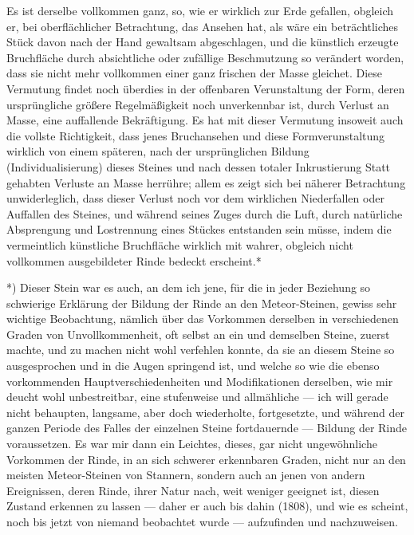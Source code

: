 \documentclass[a4paper, 11pt, oneside, german]{article}
\begin{document}
Es ist derselbe vollkommen ganz, so, wie er wirklich zur Erde gefallen, obgleich er, bei oberflächlicher Betrachtung, das Ansehen hat, als wäre ein beträchtliches Stück davon nach der Hand gewaltsam abgeschlagen, und die künstlich erzeugte Bruchfläche durch absichtliche oder zufällige Beschmutzung so verändert worden, dass sie nicht mehr vollkommen einer ganz frischen der Masse gleichet. Diese Vermutung findet noch überdies in der offenbaren Verunstaltung der Form, deren ursprüngliche größere Regelmäßigkeit noch unverkennbar ist, durch Verlust an Masse, eine auffallende Bekräftigung. Es hat mit dieser Vermutung insoweit auch die vollste Richtigkeit, dass jenes Bruchansehen und diese Formverunstaltung wirklich von einem späteren, nach der ursprünglichen Bildung (Individualisierung) dieses Steines und nach dessen totaler Inkrustierung Statt gehabten Verluste an Masse herrühre; allem es zeigt sich bei näherer Betrachtung unwiderleglich, dass dieser Verlust noch vor dem wirklichen Niederfallen oder Auffallen des Steines, und während seines Zuges durch die Luft, durch natürliche Absprengung und Lostrennung eines Stückes entstanden sein müsse, indem die vermeintlich künstliche Bruchfläche wirklich mit wahrer, obgleich nicht vollkommen ausgebildeter Rinde bedeckt erscheint.*

*) Dieser Stein war es auch, an dem ich jene, für die in jeder Beziehung so schwierige Erklärung der Bildung der Rinde an den Meteor-Steinen, gewiss sehr wichtige Beobachtung, nämlich über das Vorkommen derselben in verschiedenen Graden von Unvollkommenheit, oft selbst an ein und demselben Steine, zuerst machte, und zu machen nicht wohl verfehlen konnte, da sie an diesem Steine so ausgesprochen und in die Augen springend ist, und welche so wie die ebenso vorkommenden Hauptverschiedenheiten und Modifikationen derselben, wie mir deucht wohl unbestreitbar, eine stufenweise und allmähliche --- ich will gerade nicht behaupten, langsame, aber doch wiederholte, fortgesetzte, und während der ganzen Periode des Falles der einzelnen Steine fortdauernde --- Bildung der Rinde voraussetzen. Es war mir dann ein Leichtes, dieses, gar nicht ungewöhnliche Vorkommen der Rinde, in an sich schwerer erkennbaren Graden, nicht nur an den meisten Meteor-Steinen von Stannern, sondern auch an jenen von andern Ereignissen, deren Rinde, ihrer Natur nach, weit weniger geeignet ist, diesen Zustand erkennen zu lassen --- daher er auch bis dahin (1808), und wie es scheint, noch bis jetzt von niemand beobachtet wurde --- aufzufinden und nachzuweisen.
\end{document}
